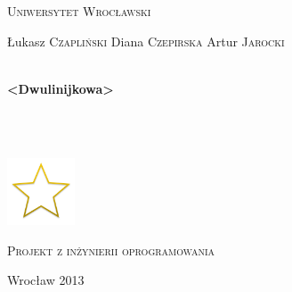\begin{titlepage}
  \begin{center}

    \textsc{\LARGE Uniwersytet Wrocławski}\\[1.5cm]


    \vspace{3cm}

    \begin{minipage}{\textwidth}
      \begin{center} \Large
        Łukasz \textsc{Czapliński}
        Diana \textsc{Czepirska}
        Artur \textsc{Jarocki}
      \end{center}
    \end{minipage}

    \vspace{0.5cm}



    \HRule \\[0.4cm]
    { \Huge \bfseries <Dwulinijkowa>\\<nazwa projektu>  \\[0.4cm] }

    \HRule \\[1.5cm]


    \vspace{1cm}

    \includegraphics[width=0.15\textwidth]{./non-starred.png}~\\[1cm]
    
    \vfill
    
    \textsc{\Large Projekt z inżynierii oprogramowania}\\[0.5cm]

    \vspace{1cm}

    {\large Wrocław 2013}

  \end{center}
\end{titlepage}
